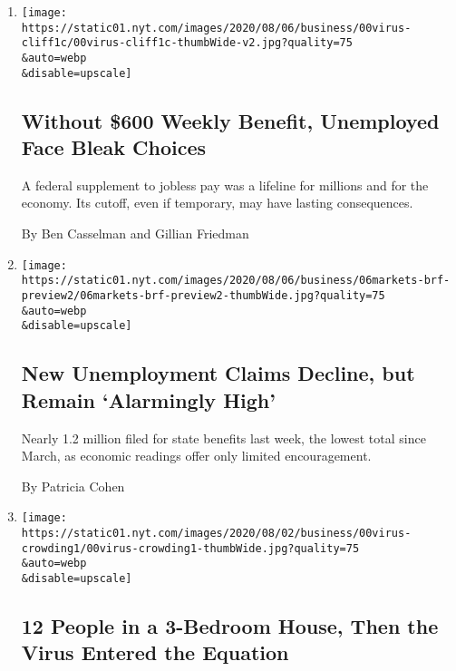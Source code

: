 \begin{enumerate}
\def\labelenumi{\arabic{enumi}.}
\item
  \href{/2020/08/08/business/economy/lost-unemployment-benefits.html}{}

  \texttt{[image: https://static01.nyt.com/images/2020/08/06/business/00virus-cliff1c/00virus-cliff1c-thumbWide-v2.jpg?quality=75\\\&auto=webp\\\&disable=upscale]}

  \hypertarget{without-600-weekly-benefit-unemployed-face-bleak-choices}{%
  \subsection{Without \$600 Weekly Benefit, Unemployed Face Bleak
  Choices}\label{without-600-weekly-benefit-unemployed-face-bleak-choices}}

  A federal supplement to jobless pay was a lifeline for millions and
  for the economy. Its cutoff, even if temporary, may have lasting
  consequences.

  By Ben Casselman and Gillian Friedman
\item
  \href{/2020/08/06/business/economy/unemployment-claims.html}{}

  \texttt{[image: https://static01.nyt.com/images/2020/08/06/business/06markets-brf-preview2/06markets-brf-preview2-thumbWide.jpg?quality=75\\\&auto=webp\\\&disable=upscale]}

  \hypertarget{new-unemployment-claims-decline-but-remain-alarmingly-high}{%
  \subsection{New Unemployment Claims Decline, but Remain `Alarmingly
  High'}\label{new-unemployment-claims-decline-but-remain-alarmingly-high}}

  Nearly 1.2 million filed for state benefits last week, the lowest
  total since March, as economic readings offer only limited
  encouragement.

  By Patricia Cohen
\item
  \href{/2020/08/01/business/economy/housing-overcrowding-coronavirus.html}{}

  \texttt{[image: https://static01.nyt.com/images/2020/08/02/business/00virus-crowding1/00virus-crowding1-thumbWide.jpg?quality=75\\\&auto=webp\\\&disable=upscale]}

  \hypertarget{12-people-in-a-3-bedroom-house-then-the-virus-entered-the-equation}{%
  \subsection{12 People in a 3-Bedroom House, Then the Virus Entered the
  Equation}\label{12-people-in-a-3-bedroom-house-then-the-virus-entered-the-equation}}


\end{enumerate}
